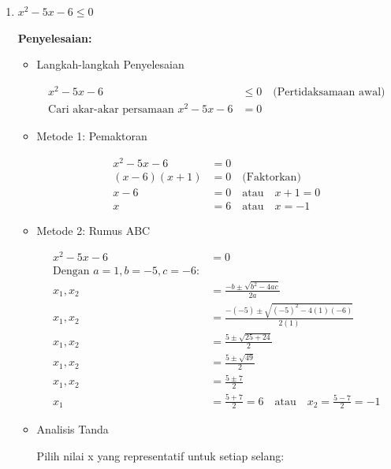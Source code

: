 \documentclass{article}
\begin{document}
\begin{enumerate}
\begin{itemize}
    \item HP: $\left(-\frac{1}{2}, 3\right)$
    \end{itemize}
    
    \item $x^{2}-5x-6 \le 0$
    
    \textbf{Penyelesaian:}
    
    \begin{itemize}
    \item Langkah-langkah Penyelesaian
    
    \begin{align}
    x^2 - 5x - 6 &\leq 0 \quad \text{(Pertidaksamaan awal)} \\
    \text{Cari akar-akar persamaan } x^2 - 5x - 6 &= 0
    \end{align}
    
    \item Metode 1: Pemaktoran
    
    \begin{align}
    x^2 - 5x - 6 &= 0 \\
    (x - 6)(x + 1) &= 0 \quad \text{(Faktorkan)} \\
    x - 6 &= 0 \quad \text{atau} \quad x + 1 = 0 \\
    x &= 6 \quad \text{atau} \quad x = -1
    \end{align}
    
    \item Metode 2: Rumus ABC
    
    \begin{align}
    x^2 - 5x - 6 &= 0 \\
    \text{Dengan } a = 1, b = -5, c = -6: & \\
    x_1,x_2 &= \frac{-b \pm \sqrt{b^2 - 4ac}}{2a} \\
    x_1,x_2 &= \frac{-(-5) \pm \sqrt{(-5)^2 - 4(1)(-6)}}{2(1)} \\
    x_1,x_2 &= \frac{5 \pm \sqrt{25 + 24}}{2} \\
    x_1,x_2 &= \frac{5 \pm \sqrt{49}}{2} \\
    x_1,x_2 &= \frac{5 \pm 7}{2} \\
    x_1 &= \frac{5 + 7}{2} = 6 \quad \text{atau} \quad x_2 = \frac{5 - 7}{2} = -1
    \end{align}
    
    \item Analisis Tanda
    
    Pilih nilai x yang representatif untuk setiap selang:
    

\end{itemize}
\end{enumerate}
\end{document}
